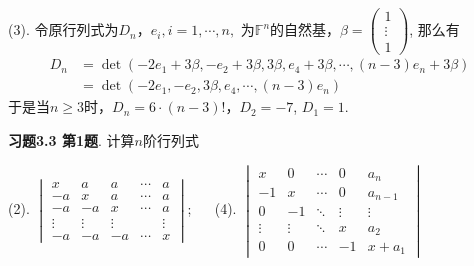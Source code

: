 (3). 令原行列式为$D_n$，$e_i, i=1,\cdots,n,$ 为$\mathbb{F}^n$的自然基，$\beta = \begin{pmatrix} 1 \\ \vdots \\ 1 \end{pmatrix}$, 那么有
\begin{align*}
D_n & = \det (-2e_1+3\beta, -e_2+3\beta, 3\beta, e_4+3\beta, \cdots, (n-3)e_n+3\beta) \\
& = \det (-2e_1, -e_2, 3\beta, e_4, \cdots, (n-3)e_n)
\end{align*}
于是当$n \geqslant 3$时，$D_n = 6 \cdot (n-3)!$，$D_2 = -7$, $D_1 = 1$.

\newpageorvspace

{\bf 习题3.3 第1题}. 计算$n$阶行列式

(2). $\begin{vmatrix} x & a & a & \cdots & a \\ -a & x & a & \cdots & a \\ -a & -a & x & \cdots & a \\ \vdots & \vdots & \vdots & & \vdots \\ -a & -a & -a & \cdots & x \end{vmatrix}$; $\quad$ (4). $\begin{vmatrix} x & 0 & \cdots & 0 & a_n \\ -1 & x & \cdots & 0 & a_{n-1} \\ 0 & -1 & \ddots & \vdots & \vdots \\ \vdots & \vdots & \ddots & x & a_2 \\ 0 & 0 & \cdots & -1 & x+a_1 \end{vmatrix}$


